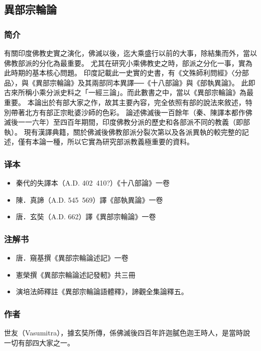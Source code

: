 \subsection{異部宗輪論}

\subsubsection{简介}
有關印度佛教史實之演化，佛滅以後，迄大乘盛行以前的大事，除結集而外，當以佛教部派的分化為最重要。
尤其在研究小乘佛教史之時，部派之分化一事，實為此時期的基本核心問題。
印度記載此一史實的史書，有《文殊師利問經》〈分部品〉，與《異部宗輪論》及其兩部同本異譯──《十八部論》與《部執異論》。
此即古來所稱小乘分派史料之「一經三論」。而此數書之中，當以《異部宗輪論》為最重要。
本論出於有部大家之作，故其主要內容，完全依照有部的說法來敘述，特別帶著北方有部正宗毗婆沙師的色彩。
論述佛滅後一百餘年（秦、陳譯本都作佛滅後一一六年）至四百年期間，印度佛教分派的歷史和各部派不同的教義（即部執）。
現有漢譯典籍，關於佛滅後佛教部派分裂次第以及各派異執的較完整的記述，僅有本論一種，所以它實為研究部派教義極重要的資料。

\subsubsection{译本}
\begin{itemize}
  \item 秦代的失譯本（A.D. 402~410?）《十八部論》一卷
  \item 陳．真諦（A.D. 545~569）譯《部執異論》一卷
  \item 唐．玄奘（A.D. 662）譯《異部宗輪論》一卷
\end{itemize}

\subsubsection{注解书}
\begin{itemize}
  \item 唐．窺基撰《異部宗輪論述記》一卷
  \item 憲榮撰《異部宗輪論述記發軔》共三冊
  \item 演培法師釋註《異部宗輪論語體釋》，諦觀全集論釋五。
\end{itemize}

\subsubsection{作者}
世友（Vasumitra），據玄奘所傳，係佛滅後四百年許迦膩色迦王時人，是當時說一切有部四大家之一。

